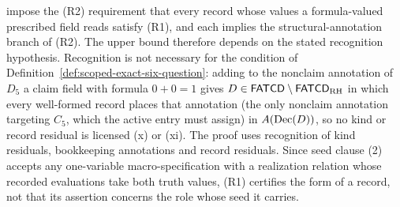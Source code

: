 \begin{remark}
impose the (R2) requirement that every record whose values a formula-valued prescribed field reads satisfy (R1), and each implies the structural-annotation branch of
(R2). The upper bound therefore depends on the stated
recognition hypothesis. Recognition is not necessary for the condition of Definition~\ref{def:scoped-exact-six-question}: adding to the nonclaim annotation of \(D_5\) a claim field with formula \(0+0=1\) gives \(D\in\mathsf{FATCD}{}\setminus\mathsf{FATCD}_{\mathrm{RH}}\) in which every well-formed record places that annotation (the only nonclaim annotation targeting \(C_5\), which the active \Pfive{} entry must assign) in \(A(\operatorname{Dec}\!\left(D\right))\), so no kind or record residual is licensed (x) or (xi). The proof uses recognition of kind residuals, bookkeeping annotations and record residuals. Since seed clause (2) accepts any one-variable
macro-specification with a realization relation whose recorded evaluations take both truth values, (R1)
certifies the form of a record, not that its assertion concerns the role
whose seed it carries.
\end{remark}
